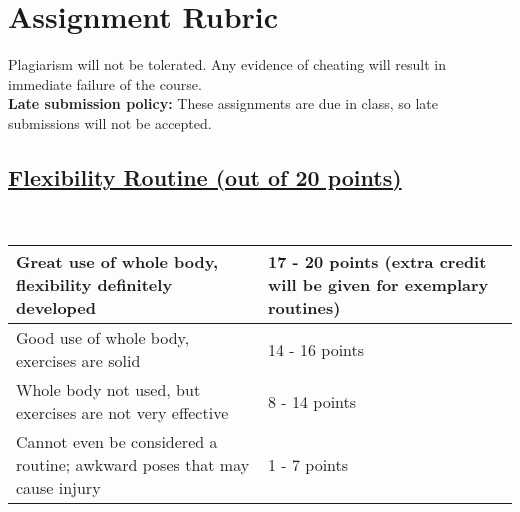 \documentclass[a4paper, 11pt]{article}
\begin{document}
\section*{Assignment Rubric}
Plagiarism will not be tolerated. Any evidence of cheating will result in immediate failure of the course.\\ 
\textbf {Late submission policy:}
These assignments are due in class, so late submissions will not be accepted.

\subsection*{\underline{Flexibility Routine (out of 20 points)}}
\\
\begin{center}
\begin{tabular}{ | m{6cm} | m{6cm} | } 
\hline
\vspace{.2cm}Great use of whole body, flexibility definitely developed \vspace{.2cm}& \vspace{.2cm} 17 - 20 points (extra credit will be given for exemplary routines) \vspace{.2cm} \\ 
\hline
\vspace{.2cm}Good use of whole body, exercises are solid \vspace{.2cm}& \vspace{.2cm} 14 - 16 points \vspace{.2cm}  \\ 
\hline
\vspace{.2cm}Whole body not used, but exercises are not very effective \vspace{.2cm} &\vspace{.2cm} 8 - 14 points\vspace{.2cm}  \\ 
\hline
\vspace{.2cm}Cannot even be considered a routine; awkward poses that may cause injury\vspace{.2cm} & \vspace{.2cm}1 - 7 points \vspace{.2cm} \\ 
\hline
\end{tabular}
\end{center}
\end{document}
